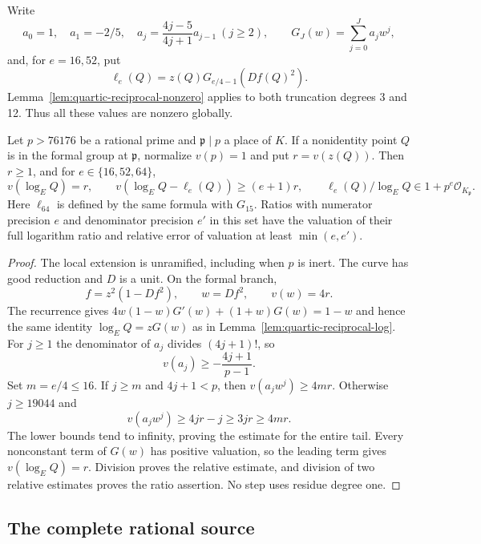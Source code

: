 Write
\[
 a_0=1,\quad a_1=-2/5,\quad
 a_j=\frac{4j-5}{4j+1}a_{j-1}\ (j\ge2),\qquad
 G_J(w)=\sum_{j=0}^J a_jw^j,
\]
and, for $e=16,52$, put
\begin{equation}\label{eq:v5-log}
 \ell_e(Q)=z(Q)G_{e/4-1}(Df(Q)^2).
\end{equation}
Lemma~\ref{lem:quartic-reciprocal-nonzero} applies to both truncation
degrees 3 and 12. Thus all these values are nonzero globally.

\begin{lemma}
\label{lem:v5-unramified-log}
Let $p>76176$ be a rational prime and $\mathfrak p\mid p$ a place
of $K$. If a nonidentity point $Q$ is in the formal group at
$\mathfrak p$, normalize $v(p)=1$ and put $r=v(z(Q))$. Then $r\ge1$,
and for $e\in\{16,52,64\}$,
\[
 v(\log_E Q)=r,\qquad
 v(\log_E Q-\ell_e(Q))\ge(e+1)r,\qquad
 \ell_e(Q)/\log_E Q\in1+p^e\mathcal O_{K_{\mathfrak p}}.
\]
Here $\ell_{64}$ is defined by the same formula with $G_{15}$.
Ratios with numerator precision $e$ and denominator precision $e'$
in this set have the valuation of their full logarithm ratio and
relative error of valuation at least $\min(e,e')$.
\end{lemma}
\begin{proof}
The local extension is unramified, including when $p$ is inert.
The curve has good reduction and $D$ is a unit. On the formal branch,
\[
 f=z^2(1-Df^2),\qquad w=Df^2,\qquad v(w)=4r.
\]
The recurrence gives
$4w(1-w)G'(w)+(1+w)G(w)=1-w$ and hence the same identity
$\log_E Q=zG(w)$ as in Lemma~\ref{lem:quartic-reciprocal-log}.
For $j\ge1$ the denominator of $a_j$ divides $(4j+1)!$, so
\[
 v(a_j)\ge-\frac{4j+1}{p-1}.
\]
Set $m=e/4\le16$. If $j\ge m$ and $4j+1<p$, then
$v(a_jw^j)\ge4mr$. Otherwise $j\ge19044$ and
\[
 v(a_jw^j)\ge4jr-j\ge3jr\ge4mr.
\]
The lower bounds tend to infinity, proving the estimate for the
entire tail. Every nonconstant term of $G(w)$ has positive valuation,
so the leading term gives $v(\log_E Q)=r$. Division proves the
relative estimate, and division of two relative estimates proves
the ratio assertion. No step uses residue degree one.
\end{proof}

\subsection{The complete rational source}
\label{subsec:v5-complete-source}

